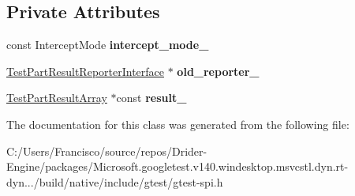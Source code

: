 \subsection*{Private Attributes}
\begin{DoxyCompactItemize}
\item 
\mbox{\label{classtesting_1_1_scoped_fake_test_part_result_reporter_ae62ed825619c11ac21fdd06480e0d982}} 
const Intercept\+Mode {\bfseries intercept\+\_\+mode\+\_\+}
\item 
\mbox{\label{classtesting_1_1_scoped_fake_test_part_result_reporter_a4183b091842a83dd8ce4927746c43092}} 
\hyperlink{classtesting_1_1_test_part_result_reporter_interface}{Test\+Part\+Result\+Reporter\+Interface} $\ast$ {\bfseries old\+\_\+reporter\+\_\+}
\item 
\mbox{\label{classtesting_1_1_scoped_fake_test_part_result_reporter_a729a26c94e4082ee0dc3312395a3f480}} 
\hyperlink{classtesting_1_1_test_part_result_array}{Test\+Part\+Result\+Array} $\ast$const {\bfseries result\+\_\+}
\end{DoxyCompactItemize}


The documentation for this class was generated from the following file\+:\begin{DoxyCompactItemize}
\item 
C\+:/\+Users/\+Francisco/source/repos/\+Drider-\/\+Engine/packages/\+Microsoft.\+googletest.\+v140.\+windesktop.\+msvcstl.\+dyn.\+rt-\/dyn.../build/native/include/gtest/gtest-\/spi.\+h\end{DoxyCompactItemize}
